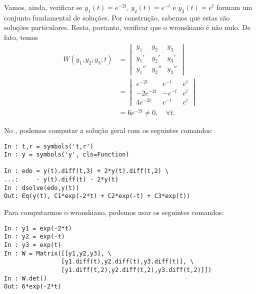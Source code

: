 \begin{ex}
  Vamos, ainda, verificar se $y_1(t) = e^{-2t}$, $y_2(t) = e^{-t}$ e $y_3(t) = e^t$ formam um conjunto fundamental de soluções. Por construção, sabemos que estas são soluções particulares. Resta, portanto, verificar que o wronskiano é não nulo. De fato, temos
  \begin{align}
    W(y_1, y_2, y_3; t) &=
                          \begin{vmatrix}
                            y_1 & y_2 & y_3 \\
                            y_1' & y_2' & y_3' \\
                            y_1'' & y_2'' & y_3''
                          \end{vmatrix} \\
                        &=
                          \begin{vmatrix}
                            e^{-2t} & e^{-t} & e^t \\
                            -2e^{-2t} & -e^{-t} & e^t \\
                            4e^{-2t} & e^{-t} & e^t
                          \end{vmatrix} \\
                        &= 6e^{-2t} \neq 0,\quad \forall t.
  \end{align}

  \ifispython
  No \python, podemos computar a solução geral com os seguintes comandos:
\begin{verbatim}
In : t,r = symbols('t,r')
In : y = symbols('y', cls=Function)

In : edo = y(t).diff(t,3) + 2*y(t).diff(t,2) \
...:     - y(t).diff(t) - 2*y(t)  
In : dsolve(edo,y(t))
Out: Eq(y(t), C1*exp(-2*t) + C2*exp(-t) + C3*exp(t))
\end{verbatim}
  Para computarmos o wronskiano, podemos usar os seguintes comandos:
\begin{verbatim}
In : y1 = exp(-2*t)
In : y2 = exp(-t)
In : y3 = exp(t)
In : W = Matrix([[y1,y2,y3], \
                [y1.diff(t),y2.diff(t),y3.diff(t)], \
                [y1.diff(t,2),y2.diff(t,2),y3.diff(t,2)]])
In : W.det()
Out: 6*exp(-2*t)
\end{verbatim}
  \fi
\end{ex}

